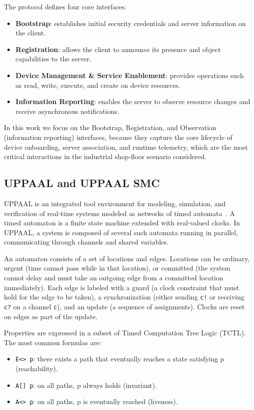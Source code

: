 \documentclass[a4paper,fleqn]{cas-sc}
\begin{document}
The protocol defines four core interfaces:
\begin{itemize}
\item \textbf{Bootstrap}: establishes initial security credentials and server information on the client.
\item \textbf{Registration}: allows the client to announce its presence and object capabilities to the server.
\item \textbf{Device Management \& Service Enablement}: provides operations such as read, write, execute, and create on device resources.
\item \textbf{Information Reporting}: enables the server to observe resource changes and receive asynchronous notifications.
\end{itemize}

In this work we focus on the Bootstrap, Registration, and Observation (information reporting) interfaces, because they capture the core lifecycle of device onboarding, server association, and runtime telemetry, which are the most critical interactions in the industrial shop‑floor scenario considered.

\subsection{UPPAAL and UPPAAL SMC}
UPPAAL is an integrated tool environment for modeling, simulation, and verification of real‑time systems modeled as networks of timed automata~\cite{larsen1997uppaal}. A timed automaton is a finite state machine extended with real‑valued clocks. In UPPAAL, a system is composed of several such automata running in parallel, communicating through channels and shared variables.

An automaton consists of a set of locations and edges. Locations can be ordinary, urgent (time cannot pass while in that location), or committed (the system cannot delay and must take an outgoing edge from a committed location immediately). Each edge is labeled with a guard (a clock constraint that must hold for the edge to be taken), a synchronization (either sending \texttt{c!} or receiving \texttt{c?} on a channel \texttt{c}), and an update (a sequence of assignments). Clocks are reset on edges as part of the update.

Properties are expressed in a subset of Timed Computation Tree Logic (TCTL). The most common formulas are: 
\begin{itemize}
    \item \texttt{E<> p}: there exists a path that eventually reaches a state satisfying p (reachability).
    \item \texttt{A[] p}: on all paths, p always holds (invariant).
    \item \texttt{A<> p}: on all paths, p is eventually reached (liveness).
\end{itemize}
\end{document}
